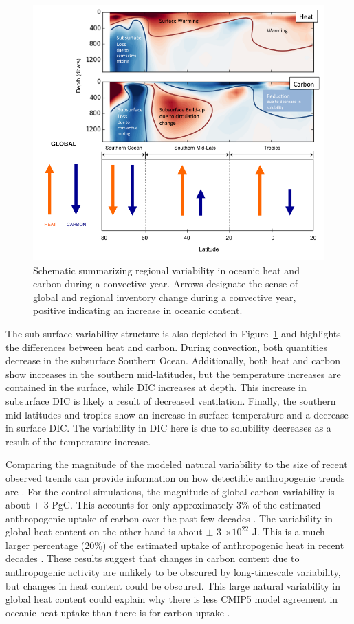 \begin{figure}
\noindent
\centering
\includegraphics[width=1\linewidth]{schematic.png}
\caption{Schematic summarizing regional variability in oceanic heat and carbon
during a convective year. Arrows designate the sense of global and regional
inventory change during a convective year, positive indicating an increase in
oceanic content.}
\label{fig:schematic}
\end{figure}

The sub-surface variability structure is also depicted in Figure~\ref{fig:schematic}
and highlights the differences between heat and carbon.
During convection, both quantities decrease in the subsurface Southern Ocean.
Additionally, both heat and carbon show increases in the southern mid-latitudes,
but the temperature increases are contained in the surface, while DIC increases
at depth. This increase in subsurface DIC is likely a result of decreased
ventilation. Finally, the southern mid-latitudes and tropics show an increase in
surface temperature and a decrease in surface DIC. The variability in DIC here
is due to solubility decreases as a result of the temperature increase.

Comparing the magnitude of the modeled natural variability to the size of recent
observed trends can provide information on how detectible anthropogenic trends
are \citep{Thomas2015}. For the control simulations, the magnitude of global
carbon variability is about $\pm$ 3 PgC. This accounts for only approximately
3\% of the estimated anthropogenic uptake of carbon over the past few decades
\citep{Khatiwala2012,Sabine2004,Waugh2006}. The variability in global heat
content on the other hand is about $\pm$ 3 $\times 10^{22}$ J. This is a much
larger percentage (20\%) of the estimated uptake of anthropogenic heat in recent
decades \citep{Levitus2009}. These results suggest that changes in carbon
content due to anthropogenic activity are unlikely to be obscured by
long-timescale variability, but changes in heat content could be obscured. This
large natural variability in global heat content could explain why there is less
CMIP5 model agreement in oceanic heat uptake than there is for carbon uptake
\citep{Frolicher2009}.

